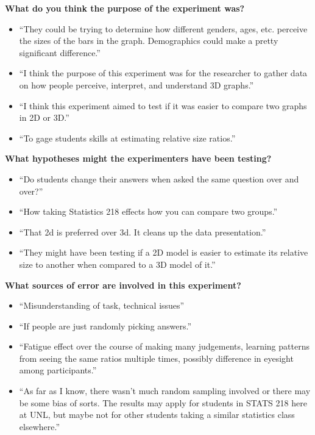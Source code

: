 \documentclass[
]{article}
\begin{document}
\textbf{What do you think the purpose of the experiment was?}

\begin{itemize}
\item
  ``They could be trying to determine how different genders, ages, etc.
  perceive the sizes of the bars in the graph. Demographics could make a
  pretty significant difference.''
\item
  ``I think the purpose of this experiment was for the researcher to
  gather data on how people perceive, interpret, and understand 3D
  graphs.''
\item
  ``I think this experiment aimed to test if it was easier to compare
  two graphs in 2D or 3D.''
\item
  ``To gage students skills at estimating relative size ratios.''
\end{itemize}

\textbf{What hypotheses might the experimenters have been testing?}

\begin{itemize}
\item
  ``Do students change their answers when asked the same question over
  and over?''
\item
  ``How taking Statistics 218 effects how you can compare two groups.''
\item
  ``That 2d is preferred over 3d. It cleans up the data presentation.''
\item
  ``They might have been testing if a 2D model is easier to estimate its
  relative size to another when compared to a 3D model of it.''
\end{itemize}

\textbf{What sources of error are involved in this experiment?}

\begin{itemize}
\item
  ``Misunderstanding of task, technical issues''
\item
  ``If people are just randomly picking answers.''
\item
  ``Fatigue effect over the course of making many judgements, learning
  patterns from seeing the same ratios multiple times, possibly
  difference in eyesight among participants.''
\item
  ``As far as I know, there wasn't much random sampling involved or
  there may be some bias of sorts. The results may apply for students in
  STATS 218 here at UNL, but maybe not for other students taking a
  similar statistics class elsewhere.''
\end{itemize}
\end{document}
